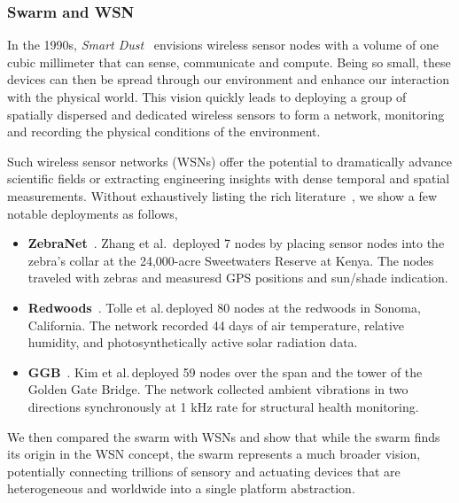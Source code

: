 \subsubsection{Swarm and WSN}
\label{sec:swarm-wsn}

In the 1990s, \textit{Smart Dust}~\cite{kahn1999next} envisions wireless sensor
nodes with a volume of one cubic millimeter that can sense, communicate and
compute. Being so small, these devices can then be spread through our
environment and enhance our interaction with the physical world. This vision
quickly leads to deploying a group of spatially dispersed and dedicated wireless
sensors to form a network, monitoring and recording the physical conditions of
the environment.

Such wireless sensor networks (WSNs) offer the potential to dramatically advance
scientific fields or extracting engineering insights with dense temporal and
spatial measurements. Without exhaustively listing the rich
literature~\cite{akyildiz2002wireless, zhao2009wireless}, we show a few notable
deployments as follows,

\begin{itemize}[itemsep=5pt]
\item \textbf{ZebraNet}~\cite{zhang2005habitat}. Zhang et al.\, deployed 7 nodes
  by placing sensor nodes into the zebra's collar at the 24,000-acre Sweetwaters
  Reserve at Kenya. The nodes traveled with zebras and measuresd GPS positions
  and sun/shade indication.
\item \textbf{Redwoods}~\cite{tolle2005macroscope}. Tolle et al.\,deployed 80
  nodes at the redwoods in Sonoma, California. The network recorded 44 days of
  air temperature, relative humidity, and photosynthetically active solar
  radiation data.
\item \textbf{GGB}~\cite{kim2007health}. Kim et al.\,deployed 59 nodes over the
  span and the tower of the Golden Gate Bridge. The network collected ambient
  vibrations in two directions synchronously at 1 kHz rate for structural health
  monitoring.
\end{itemize}

We then compared the swarm with WSNs and show that while the swarm finds its
origin in the WSN concept, the swarm represents a much broader vision,
potentially connecting trillions of sensory and actuating devices that are
heterogeneous and worldwide into a single platform abstraction.

